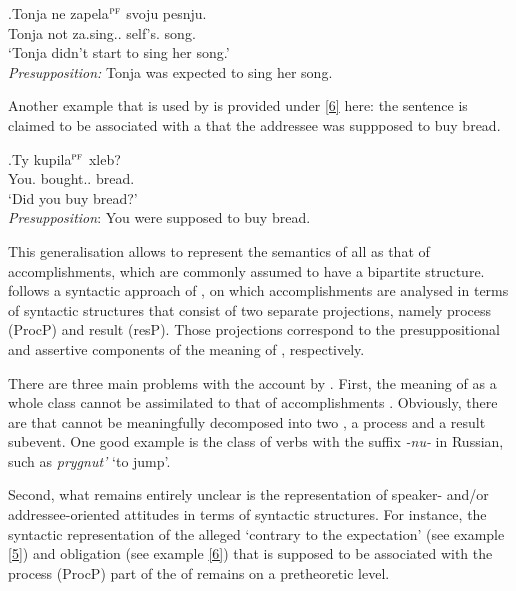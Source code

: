 \exg.\label{5}Tonja ne zapela$^{\textsc{pf}}$ svoju pesnju.\\
Tonja not za.sing.. self's. song.\\
\trans `Tonja didn't start to sing her song.'\\
\textit{Presupposition:} Tonja was expected to sing her song.\\

Another example that is used by \citet{Romanova:06} is provided under \ref{6} here: the sentence is claimed to be associated with a  that the addressee was suppposed to buy bread.

\exg.\label{6}Ty kupila$^{\textsc{pf}}$ xleb?\\
You. bought.. bread.\\
\trans `Did you buy bread?'\\
\textit{Presupposition}: You were supposed to buy bread.\\

This generalisation allows \citet{Romanova:06} to represent the semantics of all  as that of accomplishments, which are commonly assumed to have a bipartite structure. \citet{Romanova:06} follows a syntactic approach of \citet{Ramchand:04}, on which accomplishments are analysed in terms of syntactic structures that consist of two separate projections, namely process (ProcP) and result (resP). Those projections correspond to the presuppositional and assertive components of the meaning of , respectively. 

There are three main problems with the account by \citet{Romanova:06}. First, the meaning of  as a whole class cannot be assimilated to that of accomplishments \citep[for counterarguments see][]{Filip:00, FilipRothstein:05}. Obviously, there are  that cannot be meaningfully decomposed into two , a process and a result subevent. One good example is the class of  verbs with the suffix \textit{-nu-} in Russian, such as \textit{prygnut'} `to jump'. 

 Second, what remains entirely unclear is the representation of speaker- and/or addressee-oriented attitudes in terms of syntactic structures. For instance, the syntactic representation of the alleged `contrary to the expectation' (see example \ref{5}) and obligation (see example \ref{6})  that is supposed to be associated with the process (ProcP) part of the  of  remains on a pretheoretic level.

